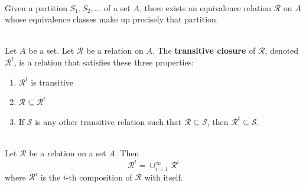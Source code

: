 \documentclass[12pt]{article}
\begin{document}
\begin{theorem}[8.3.1(Epp)]
\hfill\\
\normalfont Given a partition $S_1, S_2,\ldots$ of a set $A$, there exists an equivalence relation $\mathcal{R}$ on $A$ whose equivalence classes make up precisely that partition.
\end{theorem}
\begin{definition}
\hfill\\
\normalfont Let $A$ be a set. Let $\mathcal{R}$ be a relation on $A$. The \textbf{transitive closure} of $\mathcal{R}$, denoted $\mathcal{R}^t$, is a relation that satisfies these three properties:
\begin{enumerate}
\item $\mathcal{R}^t$ is transitive
\item $\mathcal{R}\subseteq \mathcal{R}^t$
\item If $\mathcal{S}$ is any other transitive relation such that $\mathcal{R}\subseteq\mathcal{S}$, then $\mathcal{R}^t\subseteq\mathcal{S}$.
\end{enumerate}
\end{definition}
\begin{proposition}[8.5.2]
\hfill\\
\normalfont Let $\mathcal{R}$ be a relation on a set $A$. Then
\[
\mathcal{R}^t = \cup^\infty_{i=1}\mathcal{R}^i
\]
where $\mathcal{R}^i$ is the $i$-th composition of $\mathcal{R}$ with itself.
\end{proposition}
\end{document}
